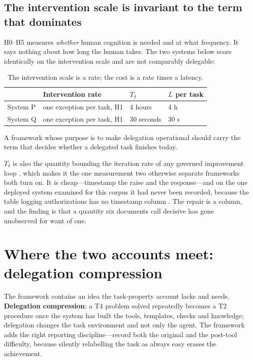 \documentclass[11pt]{article}
\theoremstyle{definition}
\newcommand{\Td}{\ensuremath{T_\delta}}
\begin{document}
\subsection{The intervention scale is invariant to the term that dominates}\label{sec:tdelta}

H0--H5 measures \emph{whether} human cognition is needed and at what frequency. It says nothing about how long the human takes. The two systems below score identically on the intervention scale and are not comparably delegable:

\begin{table}[h]
\centering\small
\begin{tabularx}{\textwidth}{@{}Ylll@{}}
\toprule
& Intervention rate & \Td{} & $L$ per task \\
\midrule
System P & one exception per task, H1 & 4 hours & 4 h \\
System Q & one exception per task, H1 & 30 seconds & 30 s \\
\bottomrule
\end{tabularx}
\caption{The intervention scale is a rate; the cost is a rate times a latency.}
\end{table}

A framework whose purpose is to make delegation operational should carry the term that decides whether a delegated task finishes today.

\Td{} is also the quantity bounding the iteration rate of any governed improvement loop \citep{yang2026twoaxisv2}, which makes it the one measurement two otherwise separate frameworks both turn on. It is cheap---timestamp the raise and the response---and on the one deployed system examined for this corpus it had never been recorded, because the table logging authorizations has no timestamp column \citep{yang2026tdelta}. The repair is a column, and the finding is that a quantity six documents call decisive has gone unobserved for want of one.

\section{Where the two accounts meet: delegation compression}\label{sec:compression}

The framework contains an idea the task-property account lacks and needs. \textbf{Delegation compression}: a T4 problem solved repeatedly becomes a T2 procedure once the system has built the tools, templates, checks and knowledge; delegation changes the task environment and not only the agent. The framework adds the right reporting discipline---record both the original and the post-tool difficulty, because silently relabelling the task as always easy erases the achievement.
\end{document}
